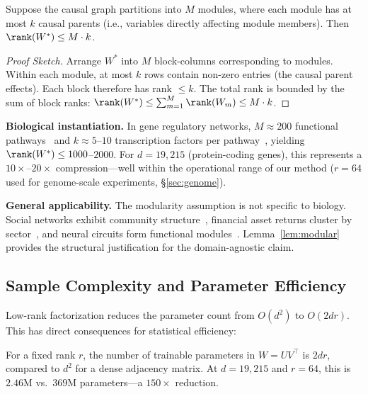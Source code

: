 \begin{lemma}\label{lem:modular}
Suppose the causal graph partitions into $M$ modules, where each module has at most $k$ causal parents (i.e., variables directly affecting module members). Then $\rank(W^*) \le M \cdot k$.
\end{lemma}

\begin{proof}[Proof Sketch]
Arrange $W^*$ into $M$ block-columns corresponding to modules. Within each module, at most $k$ rows contain non-zero entries (the causal parent effects). Each block therefore has rank $\le k$. The total rank is bounded by the sum of block ranks: $\rank(W^*) \le \sum_{m=1}^M \rank(W_m) \le M \cdot k$.
\end{proof}

\textbf{Biological instantiation.} In gene regulatory networks, $M \approx 200$ functional pathways~\citep{kanehisa2000kegg} and $k \approx 5$--$10$ transcription factors per pathway~\citep{vaquerizas2009census,lambert2018human}, yielding $\rank(W^*) \le 1000$--$2000$. For $d = 19{,}215$ (protein-coding genes), this represents a $10\times$--$20\times$ compression---well within the operational range of our method ($r = 64$ used for genome-scale experiments, \S\ref{sec:genome}).

\textbf{General applicability.} The modularity assumption is not specific to biology. Social networks exhibit community structure~\citep{girvan2002community}, financial asset returns cluster by sector~\citep{mantegna1999hierarchical}, and neural circuits form functional modules~\citep{sporns2004organization}. Lemma~\ref{lem:modular} provides the structural justification for the domain-agnostic claim.

\subsection{Sample Complexity and Parameter Efficiency}

Low-rank factorization reduces the parameter count from $O(d^2)$ to $O(2dr)$. This has direct consequences for statistical efficiency:

\begin{proposition}\label{prop:params}
For a fixed rank $r$, the number of trainable parameters in $W = U V^\top$ is $2dr$, compared to $d^2$ for a dense adjacency matrix. At $d = 19{,}215$ and $r = 64$, this is $2.46$M vs.\ $369$M parameters---a $150\times$ reduction.
\end{proposition}

